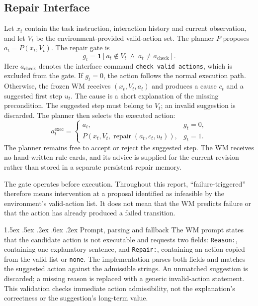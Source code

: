\documentclass[runningheads]{llncs}
\makeatletter
\renewcommand\paragraph{\@startsection{paragraph}{4}{\z@}%
  {1.5ex \@plus .5ex \@minus .2ex}%
  {.6ex \@plus .2ex}%
  {\normalfont\normalsize\bfseries}}
\makeatother
\begin{document}
\subsection{Repair Interface}
Let $x_t$ contain the task instruction, interaction history and current observation, and let $V_t$ be the environment-provided valid-action set. The planner $P$ proposes $a_t=P(x_t,V_t)$. The repair gate is
\begin{equation}
g_t=\mathbf{1}[a_t\notin V_t\;\land\;a_t\ne a_{\mathrm{check}}].
\end{equation}
Here $a_{\mathrm{check}}$ denotes the interface command \texttt{check valid actions}, which is excluded from the gate. If $g_t=0$, the action follows the normal execution path. Otherwise, the frozen WM receives $(x_t,V_t,a_t)$ and produces a cause $c_t$ and a suggested first step $u_t$. The cause is a short explanation of the missing precondition. The suggested step must belong to $V_t$; an invalid suggestion is discarded. The planner then selects the executed action:
\begin{equation}
a_t^{\mathrm{exec}}=
\begin{cases}
a_t, & g_t=0,\\
P(x_t,V_t,\operatorname{repair}(a_t,c_t,u_t)), & g_t=1.
\end{cases}
\end{equation}
The planner remains free to accept or reject the suggested step. The WM receives no hand-written rule cards, and its advice is supplied for the current revision rather than stored in a separate persistent repair memory.

The gate operates before execution. Throughout this report, ``failure-triggered'' therefore means intervention at a proposal identified as infeasible by the environment's valid-action list. It does not mean that the WM predicts failure or that the action has already produced a failed transition.

\paragraph{Prompt, parsing and fallback}
The WM prompt states that the candidate action is not executable and requests two fields: \texttt{Reason:}, containing one explanatory sentence, and \texttt{Repair:}, containing an action copied from the valid list or \texttt{none}. The implementation parses both fields and matches the suggested action against the admissible strings. An unmatched suggestion is discarded; a missing reason is replaced with a generic invalid-action statement. This validation checks immediate action admissibility, not the explanation's correctness or the suggestion's long-term value.
\end{document}
